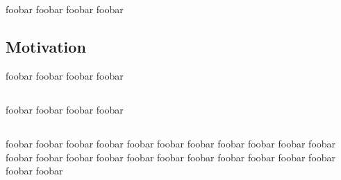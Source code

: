 \chapter{\preamble}
\label{cha:preamble}
foobar foobar foobar foobar
\section{Motivation}
\label{sec:motivation}
foobar foobar foobar foobar
\section{\target}
\label{sec:target}
foobar foobar foobar foobar
\section{\structure}
\label{sec:structure}
foobar foobar foobar foobar foobar foobar foobar foobar
foobar foobar foobar foobar foobar foobar foobar foobar
foobar foobar foobar foobar foobar foobar foobar foobar
